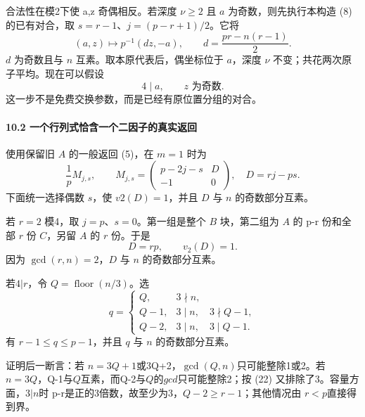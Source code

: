 {合法性在模2下使} {a,z} {奇偶相反。若深度} {\ensuremath{\nu \ge 2}} {且} {\ensuremath{a}} {为奇数，则先执行本构造} {(8)} {的已有对合，取} {\ensuremath{s=r-1}、\ensuremath{j=(p-r+1)/2}。它将} \[
(a,z)\longmapsto p^{-1}(d z,-a),\qquad
d=\frac{pr-n(r-1)}2.
\] {\ensuremath{d}} {为奇数且与} {\ensuremath{n}} {互素。取本原代表后，偶坐标位于} {\ensuremath{a}，深度} {\ensuremath{\nu }} {不变；共花两次原子平均。现在可以假设} \[
4\mid a,\qquad z\text{ 为奇数}.
\tag{C9.20}
\] {这一步不是免费交换参数，而是已经有原位置分组的对合。}

\paragraph*{\texorpdfstring{{10.2} {一个行列式恰含一个二因子的真实返回}}{10.2 一个行列式恰含一个二因子的真实返回}}\label{C9-h72}

{使用保留旧} {\ensuremath{A}} {的一般返回} {(5)，在} {\ensuremath{m=1}} {时为} \[
\frac1pM_{j,s},\qquad
M_{j,s}=
\begin{pmatrix}
p-2j-s&D\\-1&0
\end{pmatrix},\quad D=rj-ps.
\tag{C9.21}
\] {下面统一选择偶数} {\ensuremath{s}，使} {\ensuremath{v2(D)=1}，并且} {\ensuremath{D}} {与} {\ensuremath{n}} {的奇数部分互素。}

{若} {\ensuremath{r=2}} {模4，取} {\ensuremath{j=p}、\ensuremath{s=0}。第一组是整个} {\ensuremath{B}} {块，第二组为} {\ensuremath{A}} {的} {p-r} {份和全部} {\ensuremath{r}} {份} {\ensuremath{C}，另留} {\ensuremath{A}} {的} {\ensuremath{r}} {份。于是} \[
D=rp,\qquad v_2(D)=1.
\] {因为} {\ensuremath{\operatorname{gcd}(r,n)=2}，\ensuremath{D}} {与} {\ensuremath{n}} {的奇数部分互素。}

{若\ensuremath{4|r}，令} {\ensuremath{Q=\operatorname{floor}(n/3)}。选} \[
q=\begin{cases}
Q,&3\nmid n,\\
Q-1,&3\mid n,\quad3\nmid Q-1,\\
Q-2,&3\mid n,\quad3\mid Q-1.
\end{cases}
\tag{C9.22}
\] {有} {\ensuremath{r-1\le q\le p-1}，并且} {\ensuremath{q}} {与} {\ensuremath{n}} {的奇数部分互素。}

{证明后一断言：若} {\ensuremath{n=3Q+1}或3Q+2，\ensuremath{\operatorname{gcd}(Q,n)}只可能整除1或2。若} {\ensuremath{n=3Q}，Q-1与\ensuremath{Q}互素，而Q-2与\ensuremath{Q}的\ensuremath{gcd}只可能整除2；按} {(22)} {又排除了3。容量方面，\ensuremath{3|n}时} {p-r是正的3倍数，故至少为3，\ensuremath{Q-2\ge r-1}；其他情况由} {\ensuremath{r<p}直接得到界。}

